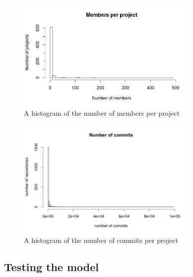 	    \begin{figure}
	        \includegraphics[width=250pt]{figures/number-of-members-per-project}
	        \caption{A histogram of the number of members per project}
	        \label{fig:number-of-members-per-project-plot}
	    \end{figure}
	    \begin{figure}
	        \includegraphics[width=250pt]{figures/number-of-commits-all}
	        \caption{A histogram of the number of commits per project}
	        \label{fig:number-of-commits-all-plot}
	    \end{figure}

    
    \subsection{Testing the model}
